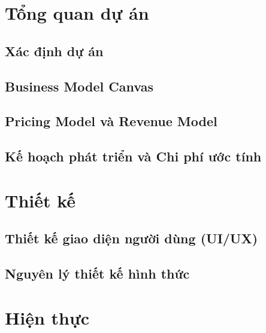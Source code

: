 \documentclass[a4paper]{report}
\begin{document}
\tableofcontents
\newpage
\listoffigures
\listoftables
\newpage

\chapter{Tổng quan dự án}
\label{chap:intro}

\section{Xác định dự án}


\section{Business Model Canvas}


\section{Pricing Model và Revenue Model}


\section{Kế hoạch phát triển và Chi phí ước tính}


\chapter{Thiết kế}
\label{chap:design}

\section{Thiết kế giao diện người dùng (UI/UX)}


\section{Nguyên lý thiết kế hình thức}


\chapter{Hiện thực}
\label{chap:impl}
\end{document}
